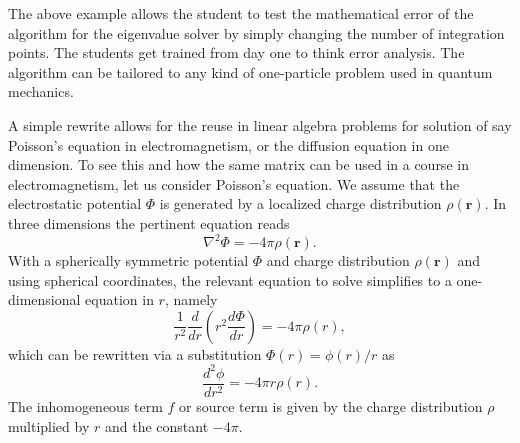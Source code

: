 \documentclass[graybox,envcountchap,sectrefs]{svmult}
\begin{document}
The above example allows the student to test the mathematical error of
the algorithm for the eigenvalue solver by simply changing the number
of integration points. The students get trained from day one to think
error analysis.  The algorithm can be tailored to any kind of
one-particle problem used in quantum mechanics.

A simple rewrite allows for the reuse in linear algebra problems for
solution of say Poisson's equation in electromagnetism, or the
diffusion equation in one dimension. To see this and how the same matrix can be used in a course in electromagnetism, let us consider
Poisson's equation.
We assume that
the electrostatic potential $\Phi$ is generated by a localized charge
distribution $\rho (\mathbf{r})$.   In three dimensions
the pertinent equation reads
\[
\nabla^2 \Phi = -4\pi \rho (\mathbf{r}).
\]
With a spherically symmetric potential $\Phi$ and charge distribution $\rho (\mathbf{r})$ and using spherical coordinates,  the relevant
equation to solve
simplifies to a one-dimensional equation in $r$, namely
\[
\frac{1}{r^2}\frac{d}{dr}\left(r^2\frac{d\Phi}{dr}\right) = -4\pi \rho(r),
\]
which can be rewritten via a substitution $\Phi(r)= \phi(r)/r$ as
\[
\frac{d^2\phi}{dr^2}= -4\pi r\rho(r).
\]
The inhomogeneous term $f$ or source term is given by the charge distribution
$\rho$  multiplied by $r$ and the constant $-4\pi$.
\end{document}
